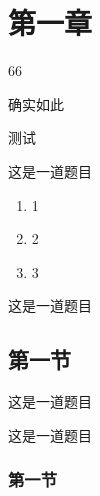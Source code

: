 \documentclass{xdyy-notes}
\begin{document}
\maketitle

\frontmatter

\begin{preface}
  \zhlipsum[1-3]
\end{preface}

\tableofcontents

\mainmatter

\chapter{第一章}
\begin{definition}
  66
\end{definition}

\begin{remark}
  确实如此
\end{remark}
\begin{changelog}[date = {2022-02-24}]
  测试
\end{changelog}


\begin{exercise}
  这是一道题目
  \begin{enumerate}
    \item 1
    \item 2
    \item 3
  \end{enumerate}
\end{exercise}

\begin{exercise}
  这是一道题目
\end{exercise}

\section{第一节}

\begin{exercise}
  这是一道题目
\end{exercise}

\begin{exercise}
  这是一道题目
\end{exercise}

\subsection{第一节}
\end{document}
